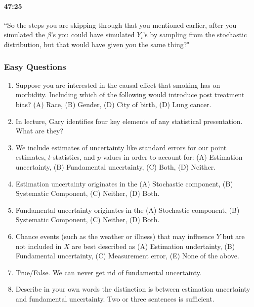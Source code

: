 \documentclass[11pt]{article}
\begin{document}
\paragraph{47:25} ``So the steps you are skipping through that you mentioned earlier, after you simulated the $\beta$'s you could have simulated $Y_i$'s by sampling from the stochastic distribution, but that would have given you the same thing?"

\subsubsection{Easy Questions}

\begin{enumerate}
\item Suppose you are interested in the causal effect that smoking has on morbidity.  Including which of the following would introduce post treatment bias? (A) Race, (B) Gender, (D) City of birth, (D) Lung cancer.
\item In lecture, Gary identifies four key elements of any statistical presentation. What are they? 
\item We include estimates of uncertainty like standard errors for our point estimates, $t$-statistics, and $p$-values in order to account for: (A) Estimation uncertainty, (B) Fundamental uncertainty, (C) Both, (D) Neither. 
\item Estimation uncertainty originates in the (A) Stochastic component, (B) Systematic Component, (C) Neither, (D) Both. 
\item Fundamental uncertainty originates in the (A) Stochastic component, (B) Systematic Component, (C) Neither, (D) Both. 
\item Chance events (such as the weather or illness) that may influence $Y$ but are not included in $X$ are best described as (A) Estimation undertainty, (B) Fundamental uncertainty, (C) Measurement error, (E) None of the above. 
\item True/False.  We can never get rid of fundamental uncertainty. 
\item Describe in your own words the distinction is between estimation uncertainty and fundamental uncertainty. Two or three sentences is sufficient. 

\end{enumerate}
\end{document}

